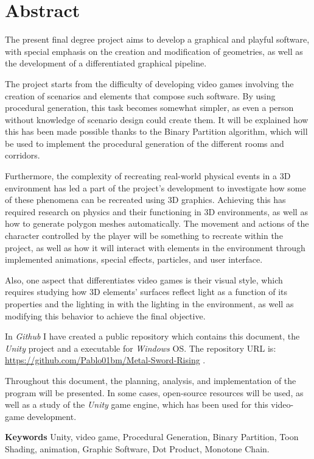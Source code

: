 \chapter{Abstract}

The present final degree project aims to develop a graphical and playful software, with special emphasis on the creation and modification of geometries, as well as the development of a differentiated graphical pipeline.

The project starts from the difficulty of developing video games involving the creation of scenarios and elements that compose such software. By using procedural generation, this task becomes somewhat simpler, as even a person without knowledge of scenario design could create them. It will be explained how this has been made possible thanks to the Binary Partition algorithm, which will be used to implement the procedural generation of the different rooms and corridors.

Furthermore, the complexity of recreating real-world physical events in a 3D environment has led a part of the project's development to investigate how some of these phenomena can be recreated using 3D graphics. Achieving this has required research on physics and their functioning in 3D environments, as well as how to generate polygon meshes automatically. The movement and actions of the character controlled by the player will be something to recreate within the project, as well as how it will interact with elements in the environment through implemented animations, special effects, particles, and user interface.

Also, one aspect that differentiates video games is their visual style, which requires studying how 3D elements' surfaces reflect light as a function of its properties and the lighting in with the lighting in the environment, as well as modifying this behavior to achieve the final objective.

In \textit{Github} I have created a public repository which contains this document, the \textit{Unity} project and a executable for \textit{Windows} OS. The repository URL is: \url{https://github.com/Pablo01bm/Metal-Sword-Rising} .

Throughout this document, the planning, analysis, and implementation of the program will be presented. In some cases, open-source resources will be used, as well as a study of the \textit{Unity} game engine, which has been used for this video-game development.

\textbf{Keywords} Unity, video game, Procedural Generation, Binary Partition, Toon Shading, animation, Graphic Software, Dot Product, Monotone Chain.
